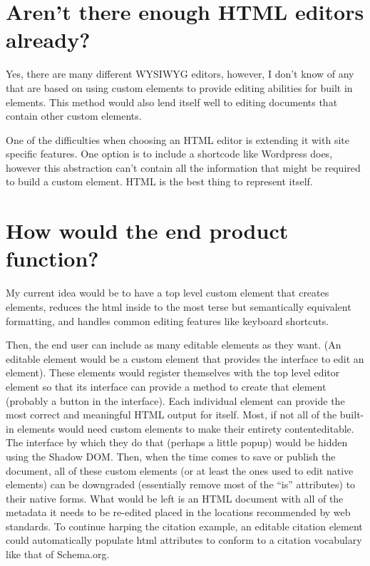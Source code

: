 \documentclass[12pt]{article}
\begin{document}
\section{Aren't there enough HTML editors already?}
{
	Yes, there are many different WYSIWYG editors, however, I don’t know of any that are based on using custom elements to provide editing abilities for built in elements.  This method would also lend itself well to editing documents that contain other custom elements.
	
	One of the difficulties when choosing an HTML editor is extending it with site specific features.  One option is to include a shortcode like Wordpress does, however this abstraction can’t contain all the information that might be required to build a custom element.  HTML is the best thing to represent itself.
}

\section{How would the end product function?}
{
	My current idea would be to have a top level custom element that creates elements, reduces the html inside to the most terse but semantically equivalent formatting, and handles common editing features like keyboard shortcuts.
	
	Then, the end user can include as many editable elements as they want.  (An editable element would be a custom element that provides the interface to edit an element).  These elements would register themselves with the top level editor element so that its interface can provide a method to create that element (probably a button in the interface).  Each individual element can provide the most correct and meaningful HTML output for itself.  Most, if not all of the built-in elements would need custom elements to make their entirety contenteditable.  The interface by which they do that (perhaps a little popup) would be hidden using the Shadow DOM.  Then, when the time comes to save or publish the document, all of these custom elements (or at least the ones used to edit native elements) can be downgraded (essentially remove most of the “is” attributes) to their native forms.  What would be left is an HTML document with all of the metadata it needs to be re-edited placed in the locations recommended by web standards.  To continue harping the citation example, an editable citation element could automatically populate html attributes to conform to a citation vocabulary like that of Schema.org.
}



\end{document}
